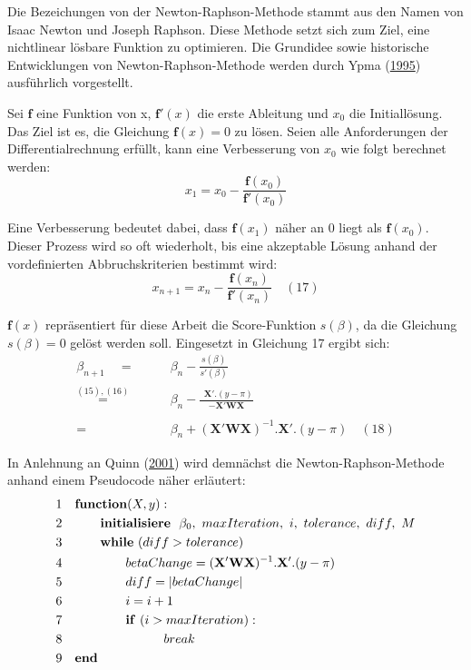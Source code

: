 \documentclass[12pt,]{article}
\begin{document}
Die Bezeichungen von der Newton-Raphson-Methode stammt aus den Namen von
Isaac Newton und Joseph Raphson. Diese Methode setzt sich zum Ziel, eine
nichtlinear lösbare Funktion zu optimieren. Die Grundidee sowie
historische Entwicklungen von Newton-Raphson-Methode werden durch Ypma
(\protect\hyperlink{ref-ypma1995historical}{1995}) ausführlich
vorgestellt.

Sei \(\mathbf{f}\) eine Funktion von x, \(\mathbf{f'}(x)\) die erste
Ableitung und \(x_0\) die Initiallösung. Das Ziel ist es, die Gleichung
\(\mathbf{f}(x) = 0\) zu lösen. Seien alle Anforderungen der
Differentialrechnung erfüllt, kann eine Verbesserung von \(x_0\) wie
folgt berechnet werden: \[
x_1 = x_0 - \frac{\mathbf{f}(x_0)}{\mathbf{f'}(x_0)}
\]

Eine Verbesserung bedeutet dabei, dass \(\mathbf{f}(x_1)\) näher an 0
liegt als \(\mathbf{f}(x_0)\). Dieser Prozess wird so oft wiederholt,
bis eine akzeptable Lösung anhand der vordefinierten Abbruchskriterien
bestimmt wird: \[
x_{n+1} = x_n - \frac{\mathbf{f}(x_n)}{\mathbf{f'}(x_n)} \quad (17)
\]

\(\mathbf{f}(x)\) repräsentiert für diese Arbeit die Score-Funktion
\(s(\beta)\), da die Gleichung \(s(\beta) = 0\) gelöst werden soll.
Eingesetzt in Gleichung 17 ergibt sich: \[
\begin{aligned}
\beta_{n+1}\quad  = \qquad &\beta_n - \frac{s(\beta)}{s'(\beta)} \\
\mathrel{\overset{(15),(16)}{=}} \quad &\beta_n - \frac{\ \  \mathbf{X}'.(y-\pi)}{- \mathbf{X}'\mathbf{W}\mathbf{X}} \\ \\
= \qquad &\beta_n + (\mathbf{X}'\mathbf{W}\mathbf{X})^{-1}.\mathbf{X}'.(y-\pi) \quad (18)
\end{aligned} 
\]

In Anlehnung an Quinn (\protect\hyperlink{ref-quinn2001newton}{2001})
wird demnächst die Newton-Raphson-Methode anhand einem Pseudocode näher
erläutert: \[
\begin{aligned}
&1 \quad \mathbf{function}(X, y): \\
&2 \qquad \quad   \mathbf{initialisiere} \ \ \beta_0,\ maxIteration,\ i,\ tolerance,\ diff,\ M \\
&3 \qquad \quad  \mathbf{while} \ (diff > tolerance) \\
&4 \qquad \qquad \quad betaChange = (\mathbf{X}'\mathbf{W}\mathbf{X})^{-1}.\mathbf{X}'.(y-\pi) \\
&5 \qquad \qquad \quad diff = | betaChange| \\
&6 \qquad \qquad \quad      i = i + 1 \\
&7 \qquad \qquad \quad      \mathbf{if} \ (i > maxIteration): \\
&8  \qquad \qquad \qquad \qquad          break \\ 
&9 \quad \bf{end} 
\end{aligned}
\]
\end{document}
